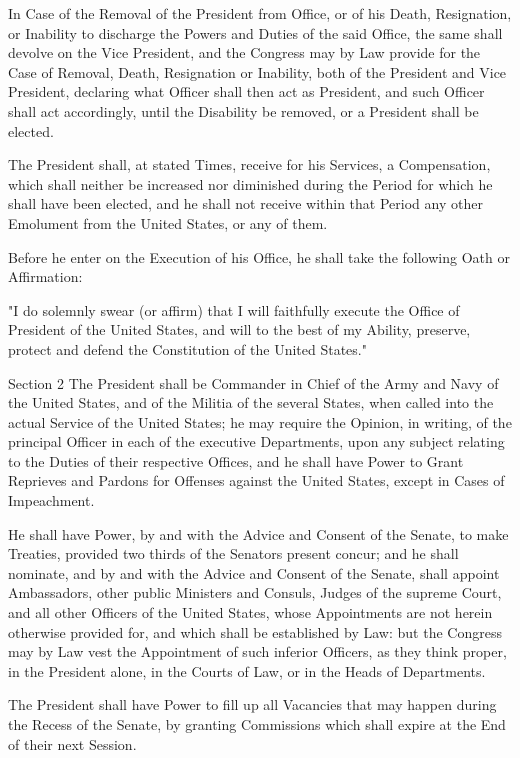 \documentclass{article}
\begin{document}
In Case of the Removal of the President from Office, or of his Death,
Resignation, or Inability to discharge the Powers and Duties of the said
Office, the same shall devolve on the Vice President, and the Congress may by
Law provide for the Case of Removal, Death, Resignation or Inability, both of
the President and Vice President, declaring what Officer shall then act as
President, and such Officer shall act accordingly, until the Disability be
removed, or a President shall be elected.

The President shall, at stated Times, receive for his Services, a Compensation,
which shall neither be increased nor diminished during the Period for which he
shall have been elected, and he shall not receive within that Period any other
Emolument from the United States, or any of them.

Before he enter on the Execution of his Office, he shall take the following
Oath or Affirmation:

"I do solemnly swear (or affirm) that I will faithfully execute the Office of
President of the United States, and will to the best of my Ability, preserve,
protect and defend the Constitution of the United States."

Section 2
The President shall be Commander in Chief of the Army and Navy of the United
States, and of the Militia of the several States, when called into the actual
Service of the United States; he may require the Opinion, in writing, of the
principal Officer in each of the executive Departments, upon any subject
relating to the Duties of their respective Offices, and he shall have Power to
Grant Reprieves and Pardons for Offenses against the United States, except in
Cases of Impeachment.

He shall have Power, by and with the Advice and Consent of the Senate, to make
Treaties, provided two thirds of the Senators present concur; and he shall
nominate, and by and with the Advice and Consent of the Senate, shall appoint
Ambassadors, other public Ministers and Consuls, Judges of the supreme Court,
and all other Officers of the United States, whose Appointments are not herein
otherwise provided for, and which shall be established by Law: but the Congress
may by Law vest the Appointment of such inferior Officers, as they think
proper, in the President alone, in the Courts of Law, or in the Heads of
Departments.

The President shall have Power to fill up all Vacancies that may happen during
the Recess of the Senate, by granting Commissions which shall expire at the End
of their next Session.
\end{document}

